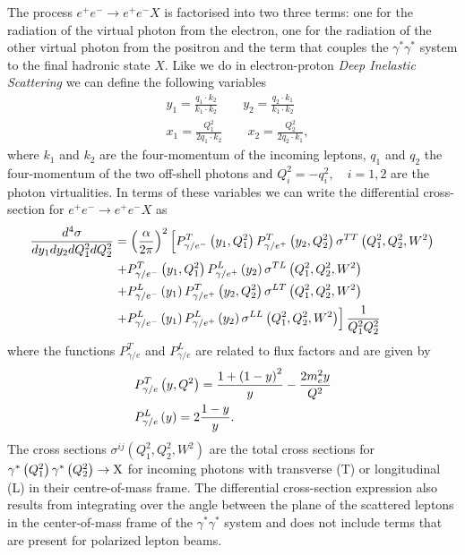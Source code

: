 \documentclass[preprint, 12pt]{elsarticle}
\begin{document}
The process $e^{+}e^{-} \rightarrow e^{+}e^{-} X$ is factorised into two three terms: one for the radiation of  the virtual photon from the electron, one for the radiation of the other virtual photon from the positron and the term that couples the $\gamma^{*} \gamma^{*}$ system to the final hadronic state $X$. Like we do in electron-proton \textit{Deep Inelastic Scattering} we can define the following variables
\begin{align}
	&y_1 = \frac{q_1 \cdot k_2}{k_1 \cdot k_2} \qquad y_2 = \frac{q_2 \cdot k_1}{k_1 \cdot k_2} \\
	& x_1 = \frac{Q_1^2}{2 q_1 \cdot k_2} \qquad x_2 = \frac{Q^2_2}{2 q_2 \cdot k_1},
\end{align}
where $k_1$ and $k_2$ are the four-momentum of the incoming leptons, $q_1$ and $q_2$ the four-momentum of the two off-shell photons and $Q_i^2 = -q_i^2, \quad i = 1, 2$ are the photon virtualities. In terms of these variables we can write the differential cross-section for $e^{+}e^{-} \rightarrow e^{+}e^{-} X$ as~\cite{donnachie_dosch_landshoff_nachtmann_2002}
\begin{align}
\frac{d^4 \sigma}{d y_1 d y_2 d Q_1^2 d Q_2^2} &= {\left( \frac{\alpha}{2 \pi} \right)}^2 \left[ P^{T}_{\gamma/e^{-}} \left(y_1, Q_1^2\right) P^{T}_{\gamma/e^{+}} \left(y_2, Q_2^2\right) \sigma^{TT} \left(Q_1^2, Q_2^2, W^2\right) \right. \notag \\
&\left. + P^{T}_{\gamma/e^{-}} \left(y_1, Q_1^2\right) P^{L}_{\gamma/e^{+}} \left(y_2\right) \sigma^{TL} \left(Q_1^2, Q_2^2, W^2\right) \right. \notag \\
&\left. + P^{L}_{\gamma/e^{-}} \left(y_1\right) P^{T}_{\gamma/e^{+}} \left(y_2, Q_2^2\right) \sigma^{LT} \left(Q_1^2, Q_2^2, W^2\right) \right. \notag \\
&\left.  + P^{L}_{\gamma/e^{-}} \left(y_1\right) P^{L}_{\gamma/e^{+}} \left(y_2\right) \sigma^{LL} \left(Q_1^2, Q_2^2, W^2\right) \right] \frac{1}{Q_1^2 Q_2^2}
\end{align}
where the functions $P^T_{\gamma / e}$ and $P^L_{\gamma / e}$ are related to flux factors and are given by
\begin{align}
&P^{T}_{\gamma/e} \left(y, Q^2\right) = \frac{1+{\left(1-y\right)}^2}{y} - \frac{2 m_e^2 y}{Q^2} \notag \\
&P^{L}_{\gamma/e} \left(y\right) = 2\frac{1-y}{y}.
\label{eq:ee_eeX_sigma}
\end{align}
The cross sections $\sigma^{ij}\left(Q_1^2, Q_2^2, W^2\right)$ are the total cross sections for $\gamma^*\left(Q_1^2\right) \gamma^{*}\left(Q_2^2\right) \rightarrow {\rm X}$ for incoming photons with transverse (T) or longitudinal (L) in their centre-of-mass frame. 
The differential cross-section expression also results from integrating over the angle between the plane of the scattered leptons in the center-of-mass frame of the $\gamma^* \gamma^*$ system and does not include terms that are present for polarized lepton beams.
\end{document}
